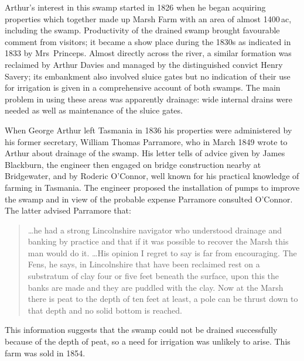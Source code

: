 Arthur's interest in this swamp started in 1826 when he began
acquiring properties which together made up Marsh Farm with an area of
almost 1400\,ac, including the swamp.  Productivity of the drained
swamp brought favourable comment from visitors; it became a show place
during the 1830s as indicated in 1833 by Mrs~Princeps.  Almost
directly across the river, a similar formation was reclaimed by Arthur
Davies and managed by the distinguished convict
Henry Savery; its embankment also involved sluice
gates but no indication of their use for irrigation is given in a
comprehensive account of both swamps.  The main problem in using these
areas was apparently drainage: wide internal drains were needed as
well as maintenance of the sluice gates.

When George Arthur left Tasmania in 1836 his properties were
administered by his former secretary, William Thomas
Parramore, who in March 1849 wrote to Arthur
about drainage of the swamp.  His letter tells of advice given by
James Blackburn, the engineer then engaged on
bridge construction nearby at Bridgewater, and by Roderic
O'Connor,  well known for his practical knowledge
of farming in Tasmania.  The engineer proposed the installation of
pumps to improve the swamp and in view of the probable expense
Parramore consulted O'Connor.  The latter advised Parramore that:
\begin{quote}
	\ldots he had a strong Lincolnshire navigator who understood
	drainage and banking by practice and that if it was possible
	to recover the Marsh this man would do it. \ldots His opinion
	I regret to say is far from encouraging.  The Fens, he says,
	in Lincolnshire that have been reclaimed rest on a substratum
	of clay four or five feet beneath the surface, upon this the
	banks are made and they are puddled with the clay.  Now at the
	Marsh there is peat to the depth of ten feet at least, a pole
	can be thrust down to that depth and no solid bottom is
	reached.
\end{quote}
This information suggests that the swamp could not be drained
successfully because of the depth of peat, so a need for irrigation
was unlikely to arise.  This farm was sold in 1854.

